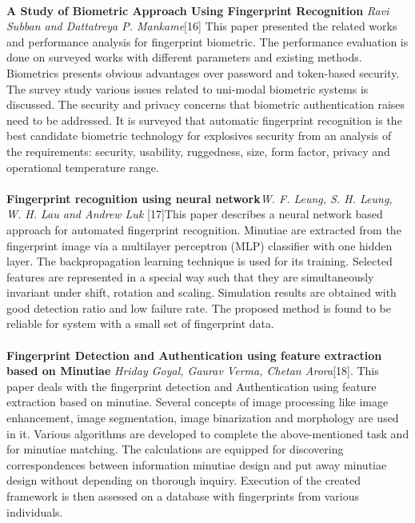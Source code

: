 \documentclass[a4paper,12pt,oneside]{article}
\begin{document}
\paragraph{}
\textbf{A Study of Biometric Approach Using Fingerprint
Recognition} \textit{ Ravi Subban and Dattatreya P. Mankame}[16] This paper presented the related works and performance
analysis for fingerprint biometric. The performance
evaluation is done on surveyed works with different
parameters and existing methods. Biometrics presents
obvious advantages over password and token-based security.
The survey study various issues related to uni-modal
biometric systems is discussed. The security and privacy
concerns that biometric authentication raises need to be
addressed. It is surveyed that automatic fingerprint
recognition is the best candidate biometric technology for
explosives security from an analysis of the requirements:
security, usability, ruggedness, size, form factor, privacy and
operational temperature range. 

\paragraph{}
\textbf{Fingerprint recognition using neural network}\textit{W. F. Leung, S. H. Leung, W. H. Lau and Andrew Luk }[17]This paper describes a neural network based approach for automated
fingerprint recognition. Minutiae are extracted from the fingerprint image via a multilayer perceptron (MLP) classifier with one hidden layer. The backpropagation learning technique is used for its training. Selected features are represented in a special way such that they are simultaneously invariant under shift, rotation and scaling. Simulation results are obtained with good detection ratio and low failure rate. The proposed method is found to be reliable for system with a small set of fingerprint data. 



\paragraph{}
\textbf{ Fingerprint Detection and Authentication using feature extraction based on Minutiae }\textit{
Hriday Goyal, Gaurav Verma, Chetan Arora}[18]. This paper deals with the fingerprint
detection and Authentication using feature extraction based on
minutiae. Several concepts of image processing like image
enhancement, image segmentation, image binarization and
morphology are used in it. Various algorithms are developed to
complete the above-mentioned task and for minutiae matching.
The calculations are equipped for discovering correspondences
between information minutiae design and put away minutiae
design without depending on thorough inquiry. Execution of the
created framework is then assessed on a database with
fingerprints from various individuals.
\end{document}
